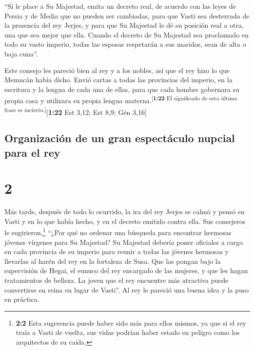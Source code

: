  ``Si le place a Su Majestad, emita un decreto real, de
acuerdo con las leyes de Persia y de Media que no pueden ser cambiadas,
para que Vasti sea desterrada de la presencia del rey Jerjes, y para que
Su Majestad le dé su posición real a otra, una que sea mejor que ella.
 Cuando el decreto de Su Majestad sea proclamado en todo
su vasto imperio, todas las esposas respetarán a sus maridos, sean de
alta o baja cuna''.

 Este consejo les pareció bien al rey y a los nobles, así
que el rey hizo lo que Memucán había dicho.  Envió cartas
a todas las provincias del imperio, en la escritura y la lengua de cada
una de ellas, para que cada hombre gobernara su propia casa y utilizara
su propia lengua materna.\textsuperscript{{[}\textbf{1:22} El
significado de esta última frase es incierto.{]}}{[}\textbf{1:22} Est
3,12; Est 8,9; Gén 3,16{]}

\hypertarget{organizaciuxf3n-de-un-gran-espectuxe1culo-nupcial-para-el-rey}{%
\subsection{Organización de un gran espectáculo nupcial para el
rey}\label{organizaciuxf3n-de-un-gran-espectuxe1culo-nupcial-para-el-rey}}

\hypertarget{section-1}{%
\section{2}\label{section-1}}

 Más tarde, después de todo lo ocurrido, la ira del rey
Jerjes se calmó y pensó en Vasti y en lo que había hecho, y en el
decreto emitido contra ella.  Sus consejeros le
sugirieron,\footnote{\textbf{2:2} Esta sugerencia puede haber sido más
  para ellos mismos, ya que si el rey traía a Vasti de vuelta, sus vidas
  podrían haber estado en peligro como los arquitectos de su caída.}
``¿Por qué no ordenar una búsqueda para encontrar hermosas jóvenes
vírgenes para Su Majestad?  Su Majestad debería poner
oficiales a cargo en cada provincia de su imperio para reunir a todas
las jóvenes hermosas y llevarlas al harén del rey en la fortaleza de
Susa. Que las pongan bajo la supervisión de Hegai, el eunuco del rey
encargado de las mujeres, y que les hagan tratamientos de belleza.
 La joven que el rey encuentre más atractiva puede
convertirse en reina en lugar de Vasti''. Al rey le pareció una buena
idea y la puso en práctica.

